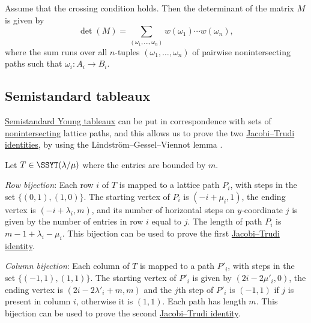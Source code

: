 \begin{theorem}\label{lindstromGesselViennotLemma}
Assume that the crossing condition holds.
Then the determinant of the matrix $M$ is given by
\[
\det(M)
=
\sum_{(\omega_1, \dotsc, \omega_n)}
w(\omega_1) \cdots w(\omega_n),
\]
where the sum runs over all $n$-tuples $(\omega_1, \dotsc, \omega_n)$ of
pairwise nonintersecting paths such that $\omega_i : A_i \to B_i$.
\end{theorem}

\subsection[LGVssyt]{Semistandard tableaux}

\hyperref[prelimTableaux]{Semistandard Young tableaux} can be put in
correspondence with sets of \hyperref[nonintersectingPaths]{nonintersecting}
lattice paths, and this allows us to prove the two
\hyperref[schurJacobiTrudi]{Jacobi--Trudi identities},
by using the Lindström--Gessel--Viennot lemma \cite{Lindstrom1973,GesselViennot1989}.

Let $T \in \SSYT(\lambda/\mu)$ where the entries are bounded by $m$.

\emph{Row bijection}:
Each row $i$ of $T$ is mapped to a lattice path $P_i$, with steps in the set
$\{ (0,1), (1,0)\}$.
The starting vertex of $P_i$ is $(-i + \mu_i,1)$,
the ending vertex is $(-i + \lambda_i, m)$,
and its number of horizontal steps on $y$-coordinate $j$ is given by the number of entries in
row $i$ equal to $j$.  The length of path $P_i$ is $m-1 + \lambda_i-\mu_i$.
This bijection can be used to prove the first \hyperref[skewJacobiTrudi]{Jacobi--Trudi identity}.


\emph{Column bijection}:
Each column of $T$ is mapped to a path $P'_i$,
with steps in the set $\{ (-1,1), (1,1)\}$.
The starting vertex of $P'_i$ is given by $(2i - 2\mu'_i, 0)$,
the ending vertex is $(2i - 2\lambda'_i + m, m)$
and the $j$th step of $P'_i$ is $(-1,1)$ if $j$ is present in column $i$,
otherwise it is $(1,1)$.  Each path has length $m$.
This bijection can be used to prove the second \hyperref[skewJacobiTrudi]{Jacobi--Trudi identity}.


